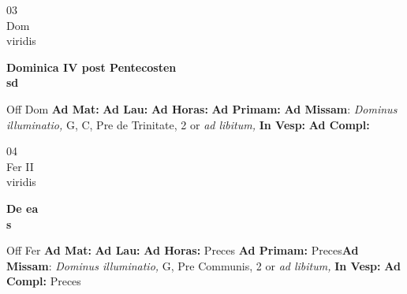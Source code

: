 \documentclass[10pt, openany]{book}
\begin{document}
    \begin{center}
        \begin{minipage}{3.5in}
            \vspace{2em}
            \begin{minipage}{0.5in}
                {\Huge 03} \\
                {\normalsize Dom} \\
                {\normalsize viridis}
            \end{minipage}
            \begin{minipage}{3.0in}
                \textbf{ \large Dominica IV post Pentecosten \\
                \textnormal{\normalsize sd}} \\ 
            \end{minipage}
            \begin{justify}Off Dom
                \textbf{Ad Mat: }
                \textbf{Ad Lau: }
                \textbf{Ad Horas: }
                \textbf{Ad Primam: }\textbf{Ad Missam}: \textit{Dominus illuminatio,} G, C, Pre de Trinitate, 2 or \textit{ad libitum,}  
                \textbf{In Vesp: }
                \textbf{Ad Compl: }
            \end{justify}
        \end{minipage}
    \end{center}

    \begin{center}
        \begin{minipage}{3.5in}
            \vspace{2em}
            \begin{minipage}{0.5in}
                {\Huge 04} \\
                {\normalsize Fer II} \\
                {\normalsize viridis}
            \end{minipage}
            \begin{minipage}{3.0in}
                \textbf{ \large De ea \\
                \textnormal{\normalsize s}} \\ 
            \end{minipage}
            \begin{justify}Off Fer
                \textbf{Ad Mat: }
                \textbf{Ad Lau: }
                \textbf{Ad Horas: }Preces
                \textbf{Ad Primam: }Preces\textbf{Ad Missam}: \textit{Dominus illuminatio,} G, Pre Communis, 2 or \textit{ad libitum,}  
                \textbf{In Vesp: }
                \textbf{Ad Compl: }Preces
            \end{justify}
        \end{minipage}
    \end{center}
\end{document}
